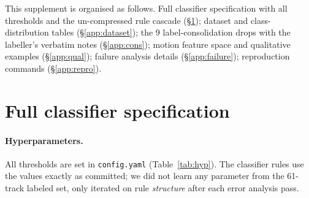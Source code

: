 \documentclass[10pt,twocolumn,letterpaper]{article}
\begin{document}
\noindent\small This supplement is organised as follows. Full
classifier specification with all thresholds and the un-compressed
rule cascade (\S\ref{app:spec}); dataset and class-distribution
tables (\S\ref{app:dataset}); the 9 label-consolidation drops with the
labeller's verbatim notes (\S\ref{app:cons}); motion feature space
and qualitative examples (\S\ref{app:qual}); failure analysis details
(\S\ref{app:failure}); reproduction commands (\S\ref{app:repro}).
\normalsize
\vspace{4pt}

\section{Full classifier specification}
\label{app:spec}

\paragraph{Hyperparameters.} All thresholds are set in
\texttt{config.yaml} (Table~\ref{tab:hyp}). The classifier rules use
the values exactly as committed; we did not learn any parameter from
the 61-track labeled set, only iterated on rule \emph{structure} after
each error analysis pass.
\end{document}
